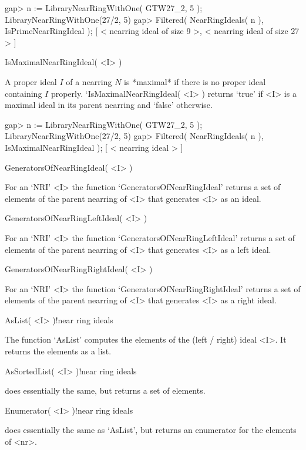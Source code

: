 \beginexample
    gap> n := LibraryNearRingWithOne( GTW27_2, 5 );
    LibraryNearRingWithOne(27/2, 5)
    gap> Filtered( NearRingIdeals( n ), IsPrimeNearRingIdeal );
    [ < nearring ideal of size 9 >, < nearring ideal of size 27 > ]
\endexample

\>IsMaximalNearRingIdeal( <I> )

A proper ideal $I$ of a nearring $N$ is *maximal* if there is no
proper ideal containing $I$ properly.
`IsMaximal\-NearRingIdeal( <I> ) returns `true' if <I> is a
maximal ideal in its parent nearring and `false' otherwise.

\beginexample
    gap> n := LibraryNearRingWithOne( GTW27_2, 5 );
    LibraryNearRingWithOne(27/2, 5)
    gap> Filtered( NearRingIdeals( n ), IsMaximalNearRingIdeal );
    [ < nearring ideal > ]
\endexample



\>GeneratorsOfNearRingIdeal( <I> )

For an `NRI' <I> the function `GeneratorsOfNearRingIdeal'
returns a set of elements of the parent nearring of <I> that generates <I>
as an ideal.

\>GeneratorsOfNearRingLeftIdeal( <I> )

For an `NRI' <I> the function `GeneratorsOfNearRingLeftIdeal'
returns a set of elements of the parent nearring of <I> that generates <I>
as a left ideal.

\>GeneratorsOfNearRingRightIdeal( <I> )

For an `NRI' <I> the function `GeneratorsOfNearRingRightIdeal'
returns a set of elements of the parent nearring of <I> that generates <I>
as a right ideal.



\>AsList( <I> )!{near ring ideals}

The function `AsList' computes the elements of the (left / right) ideal <I>.
It returns the elements as a list.

\>AsSortedList( <I> )!{near ring ideals}

does essentially the same, but returns a set of elements.

\>Enumerator( <I> )!{near ring ideals}

does essentially the same as `AsList', but returns an enumerator for the
elements of <nr>.

